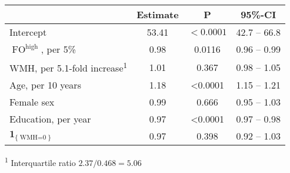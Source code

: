 \begin{table}
\setlength{\LTpost}{0mm}
\begin{longtable}{lccc}
\toprule
 & Estimate & P & 95\%-CI \\ 
\midrule
Intercept & 53.41 & $<0.0001$ & 42.7 -- 66.8 \\ 
$\operatorname{FO}^{\text{high}}$, per 5\% & 0.98 & 0.0116 & 0.96 -- 0.99 \\ 
WMH, per 5.1-fold increase\textsuperscript{1} & 1.01 & 0.367 & 0.98 -- 1.05 \\ 
Age, per 10 years & 1.18 & <0.0001 & 1.15 -- 1.21 \\ 
Female sex & 0.99 & 0.666 & 0.95 -- 1.03 \\ 
Education, per year & 0.97 & <0.0001 & 0.97 -- 0.98 \\ 
$\mathbf{1}_{\{\operatorname{WMH=0}\}}$ & 0.97 & 0.398 & 0.92 -- 1.03 \\
\bottomrule
\end{longtable}
\addtocounter{table}{-1}
\textsuperscript{1} Interquartile ratio $2.37/0.468=5.06$
\label{tab:hyp2}
\end{table}